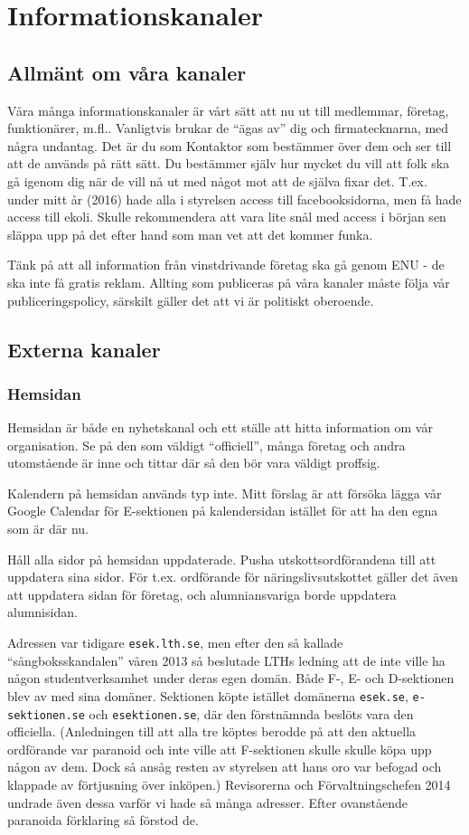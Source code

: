 \documentclass[10pt]{article}
\begin{document}
\section{Informationskanaler}
\subsection{Allmänt om våra kanaler}
Våra många informationskanaler är vårt sätt att nu ut till medlemmar, företag, funktionärer, m.fl.. Vanligtvis brukar de ``ägas av'' dig och firmatecknarna, med några undantag. Det är du som Kontaktor som bestämmer över dem och ser till att de används på rätt sätt. Du bestämmer själv hur mycket du vill att folk ska gå igenom dig när de vill nå ut med något mot att de själva fixar det. T.ex. under mitt år (2016) hade alla i styrelsen access till facebooksidorna, men få hade access till ekoli. Skulle rekommendera att vara lite snål med access i början sen släppa upp på det efter hand som man vet att det kommer funka.

Tänk på att all information från vinstdrivande företag ska gå genom ENU - de ska inte få gratis reklam. Allting som publiceras på våra kanaler måste följa vår publiceringspolicy, särskilt gäller det att vi är politiskt oberoende.

\subsection{Externa kanaler}
\subsubsection{Hemsidan}
Hemsidan är både en nyhetskanal och ett ställe att hitta information om vår organisation. Se på den som väldigt ``officiell'', många företag och andra utomstående är inne och tittar där så den bör vara väldigt proffsig.

Kalendern på hemsidan används typ inte. Mitt förslag är att försöka lägga vår Google Calendar för E-sektionen på kalendersidan istället för att ha den egna som är där nu.

Håll alla sidor på hemsidan uppdaterade. Pusha utskottsordförandena till att uppdatera sina sidor. För t.ex. ordförande för näringslivsutskottet gäller det även att uppdatera sidan för företag, och alumniansvariga borde uppdatera alumnisidan.

Adressen var tidigare \texttt{esek.lth.se}, men efter den så kallade ``sångboksskandalen'' våren 2013 så beslutade LTHs ledning att de inte ville ha någon studentverksamhet under deras egen domän. Både F-, E- och D-sektionen blev av med sina domäner. Sektionen köpte istället domänerna \texttt{esek.se}, \texttt{e-sektionen.se} och \texttt{esektionen.se}, där den förstnämnda beslöts vara den officiella. (Anledningen till att alla tre köptes berodde på att den aktuella ordförande var paranoid och inte ville att F-sektionen skulle skulle köpa upp någon av dem. Dock så ansåg resten av styrelsen att hans oro var befogad och klappade av förtjusning över inköpen.) Revisorerna och Förvaltningschefen 2014 undrade även dessa varför vi hade så många adresser. Efter ovanstående paranoida förklaring så förstod de.
\end{document}

